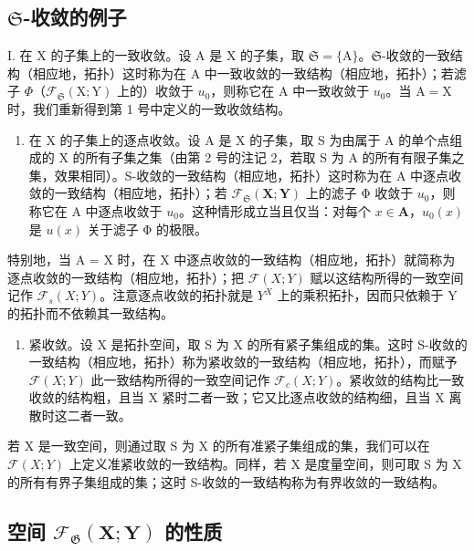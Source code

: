 \subsection{\texorpdfstring{\(\mathfrak{S}\)-收敛的例子}{S-收敛的例子}}

I. 在 X 的子集上的一致收敛。设 A 是 X 的子集，取 \(\mathfrak{S} = \{\mathrm{A}\}\)。\(\mathfrak{S}\)-收敛的一致结构（相应地，拓扑）这时称为在 A 中一致收敛的一致结构（相应地，拓扑）；若滤子 \(\Phi\)（\(\mathcal{F}_{\mathfrak{S}}(\mathrm{X};\mathrm{Y})\) 上的）收敛于 \(u_0\)，则称它在 A 中一致收敛于 \(u_0\)。当 \(\mathrm{A} = \mathrm{X}\) 时，我们重新得到第 1 号中定义的一致收敛结构。

\begin{enumerate}
\def\labelenumi{\Roman{enumi}.}
\setcounter{enumi}{1}
\tightlist
\item
  在 X 的子集上的逐点收敛。设 A 是 X 的子集，取 S 为由属于 A 的单个点组成的 X 的所有子集之集（由第 2 号的注记 2，若取 S 为 A 的所有有限子集之集，效果相同）。S-收敛的一致结构（相应地，拓扑）这时称为在 A 中逐点收敛的一致结构（相应地，拓扑）；若 \(\mathcal{F}_{\mathfrak{S}}(\mathbf{X};\mathbf{Y})\) 上的滤子 Φ 收敛于 \(u_0\)，则称它在 A 中逐点收敛于 \(u_0\)。这种情形成立当且仅当：对每个 \(x\in \mathbf{A}\)，\(u_0(x)\) 是 \(u(x)\) 关于滤子 Φ 的极限。
\end{enumerate}

特别地，当 A = X 时，在 X 中逐点收敛的一致结构（相应地，拓扑）就简称为逐点收敛的一致结构（相应地，拓扑）；把 \(\mathcal{F}(X; Y)\) 赋以这结构所得的一致空间记作 \(\mathcal{F}_{s}(X; Y)\)。注意逐点收敛的拓扑就是 \(Y^{X}\) 上的乘积拓扑，因而只依赖于 Y 的拓扑而不依赖其一致结构。

\begin{enumerate}
\def\labelenumi{\Roman{enumi}.}
\setcounter{enumi}{2}
\tightlist
\item
  紧收敛。设 X 是拓扑空间，取 S 为 X 的所有紧子集组成的集。这时 S-收敛的一致结构（相应地，拓扑）称为紧收敛的一致结构（相应地，拓扑），而赋予 \(\mathcal{F}(X;Y)\) 此一致结构所得的一致空间记作 \(\mathcal{F}_{c}(X;Y)\)。紧收敛的结构比一致收敛的结构粗，且当 X 紧时二者一致；它又比逐点收敛的结构细，且当 X 离散时这二者一致。
\end{enumerate}

若 X 是一致空间，则通过取 S 为 X 的所有准紧子集组成的集，我们可以在 \(\mathcal{F}(X;Y)\) 上定义准紧收敛的一致结构。同样，若 X 是度量空间，则可取 S 为 X 的所有有界子集组成的集；这时 S-收敛的一致结构称为有界收敛的一致结构。

\subsection{\texorpdfstring{空间 \(\mathcal{F}_{\mathfrak{G}}(\mathbf{X};\mathbf{Y})\) 的性质}{空间 F 下标 G (X;Y) 的性质}}

